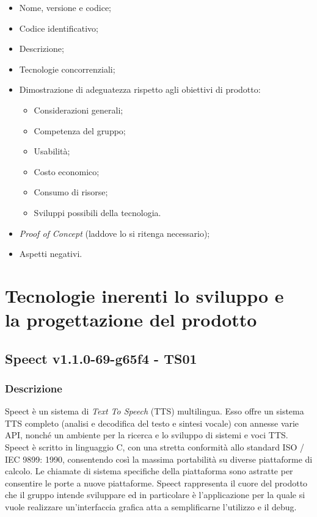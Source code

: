 \documentclass[./../Technology Baseline.tex]{subfiles}
\begin{document}
\begin{itemize}
	\item Nome, versione e codice;
	\item Codice identificativo;
	\item Descrizione;
	\item Tecnologie concorrenziali;
	\item Dimostrazione di adeguatezza rispetto agli obiettivi di prodotto:
	\begin{itemize}
		\item Considerazioni generali;
		\item Competenza del gruppo;
		\item Usabilità;
		\item Costo economico;
		\item Consumo di risorse;
		\item Sviluppi possibili della tecnologia.
	\end{itemize}
	\item \textit{Proof of Concept} (laddove lo si ritenga necessario);
	\item Aspetti negativi.
\end{itemize}

\section{Tecnologie inerenti lo sviluppo e \\ la progettazione del prodotto}

\subsection{Speect v1.1.0-69-g65f4 - TS01}

\subsubsection{Descrizione}

Speect è un sistema di \textit{Text To Speech} (TTS) multilingua. Esso offre un sistema TTS completo (analisi e decodifica del testo e sintesi vocale) con annesse varie API, nonché un ambiente per la ricerca e lo sviluppo di sistemi e voci TTS. Speect è scritto in linguaggio C, con una stretta conformità allo standard ISO / IEC 9899: 1990, consentendo così la massima portabilità su diverse piattaforme di calcolo. Le chiamate di sistema specifiche della piattaforma sono astratte per consentire le porte a nuove piattaforme. Speect rappresenta il cuore del prodotto che il gruppo intende sviluppare ed in particolare è l'applicazione per la quale si vuole realizzare un'interfaccia grafica atta a semplificarne l'utilizzo e il debug.
\end{document}
